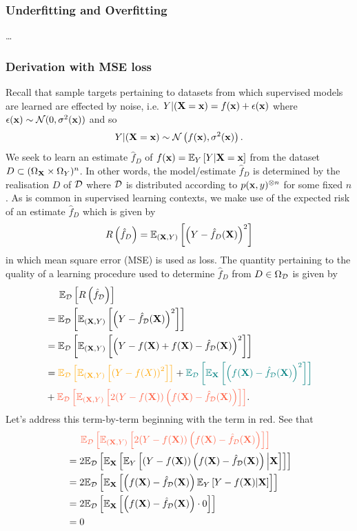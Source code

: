\documentclass[11pt]{article}
\begin{document}
\subsubsection{\TODO{: }Underfitting and Overfitting}
\dots

\subsubsection{Derivation with MSE loss}
Recall that sample targets pertaining to datasets from which supervised models are learned are effected by noise, i.e. $Y|(\mathbf{X}=\mathbf{x})=f(\mathbf{x})+\epsilon(\mathbf{x})$ where $\epsilon(\mathbf{x})\sim\mathcal{N}(0,\sigma^2(\mathbf{x}))$ and so
$$
Y|(\mathbf{X}=\mathbf{x})
\sim
\mathcal{N}\left(f(\mathbf{x}), \sigma^2(\mathbf{x})\right).
$$
We seek to learn an estimate $\hat{f}_{D}$ of $f(\mathbf{x})=\mathbb{E}_Y\left[Y|\mathbf{X}=\mathbf{x}\right]$ from the dataset $D\subset(\Omega_{\mathbf{X}}\times\Omega_Y)^n$. In other words, the model/estimate $\hat{f}_{D}$ is determined by the realisation $D$ of $\mathcal{D}$ where $\mathcal{D}$ is distributed according to $p(\mathbf{x},y)^{\otimes n}$ for some fixed $n$. As is common in supervised learning contexts, we make use of the expected risk of an estimate $\hat{f}_D$ which is given by
$$
R\left(\hat{f}_D\right)
=
\mathbb{E}_{(\mathbf{X},Y)}\left[\left(Y-\hat{f}_D(\mathbf{X})\right)^2\right]
$$
in which mean square error (MSE) is used as loss. The quantity pertaining to the quality of a learning procedure used to determine $\hat{f}_{D}$ from $D\in\Omega_{\mathcal{D}}$ is given by
\begin{align*}
    &\hspace{14.52pt}
    \E_{\D}\l[R\l(\hat{f}_{\D}\r)\r]\\
    &=
    \E_{\D}\l[\E_{(\X,Y)}\l[\l(Y-\hat{f}_{\D}(\X)\r)^2\r]\r]\nonumber\\
    &=
    \E_{\D}\l[\E_{(\X,Y)}\l[\l(Y-f(\X)+f(\X)-\hat{f}_{\D}(\X)\r)^2\r]\r]\nonumber\\
    &=
    \textcolor{myYellow}{\E_{\D}\l[\E_{(\X,Y)}\l[\l(Y-f(X)\r)^2\r]\r]}+
    \textcolor{myGreen}{\E_{\D}\l[\E_\X\l[\l(f(\X)-\hat{f}_{\D}(\X)\r)^2\r]\r]}\\
    &+\textcolor{myLightRed}{\E_{\D}\l[\E_{(\X,Y)}\l[2(Y-f(\X))\l(f(\X)-\hat{f}_{\D}(\X)\r)\r]\r]}.
\end{align*}
Let's address this term-by-term beginning with the term in red. See that
\begin{align*}
    &\hspace{14.52pt}
    \textcolor{myLightRed}{\E_{\D}\l[\E_{(\X,Y)}\l[2(Y-f(\X))\l(f(\X)-\hat{f}_{\D}(\X)\r)\r]\r]}\\
    &=
    2\E_{\D}\l[\E_\X\l[\E_{Y}\l[(Y-f(\X))\l(f(\X)-\hat{f}_{\D}(\X)\r)\Big|\X\r]\r]\r]\\
    &=
    2\E_{\D}\l[\E_\X\l[\l(f(\X)-\hat{f}_{\D}(\X)\r)\E_{Y}\l[Y-f(\X)\vert\X\r]\r]\r]\\
    &=
    2\E_{\D}\l[\E_\X\l[\l(f(\X)-\hat{f}_{\D}(\X)\r)\cdot0\r]\r]\\
    &=
    0
\end{align*}
\end{document}

